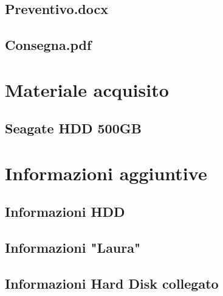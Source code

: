 \documentclass[a4paper,12pt]{report}
\begin{document}
\subsection{Preventivo.docx} \label{preventivo}
\vspace{5pt}


\subsection{Consegna.pdf} \label{consegna}
\vspace{5pt}


\pagebreak

\section{Materiale acquisito}
\subsection{Seagate HDD 500GB} \label{hdd}


\section{Informazioni aggiuntive}
\subsection{Informazioni HDD}


\subsection{Informazioni "Laura"}


\subsection{Informazioni Hard Disk collegato} \label{wd}

\end{document}
